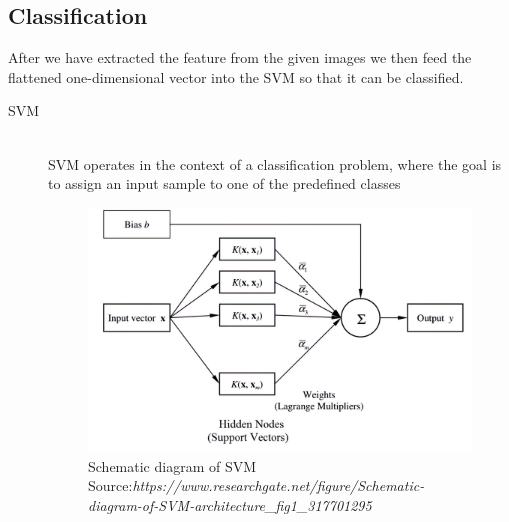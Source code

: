 \subsection{Classification}
\vspace{-18pt}
After we have extracted the feature from the given images we then feed the flattened one-dimensional vector into the SVM so that it can be classified.
\newpage
\begin{description}
\item[SVM] \hfill \\
SVM operates in the context of a classification problem, where the goal is to assign an input sample to one of the predefined classes
\begin{figure}[tbh] %
\begin{center}
	\includegraphics[width=5in]{images/svm.jpg} 
	\caption[Schematic diagram of SVM]{ \centering Schematic diagram of SVM
	\\Source:\textit{https://www.researchgate.net/figure/Schematic-diagram-of-SVM-architecture_fig1_317701295} } %
	
	\label{Schematic diagram of SVM  } %
	

\end{center}
\end{figure}
\end{description}
